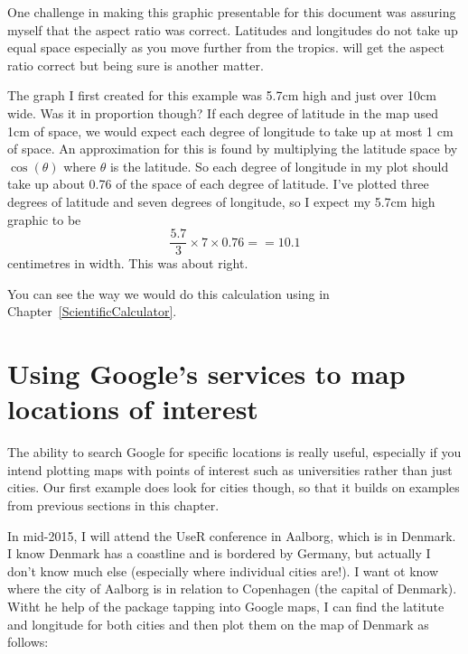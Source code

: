 One challenge in making this graphic presentable for this document  
was assuring myself that the aspect ratio was correct. Latitudes and longitudes do not take up equal space especially as you move further from the tropics. \R{} will get the aspect ratio correct but being sure is another matter.  
 
The graph I first created for this example was 5.7cm high and just over 10cm wide. Was it in proportion though? If each degree of latitude in the map used 1cm of space, we would expect each degree of longitude to take up at most 1 cm of space. An approximation for this is found by multiplying the latitude space by $\cos(\theta)$ where $\theta$ is the latitude. So each degree of longitude in my plot should take up about 0.76 of the space of each degree of latitude. I've plotted three degrees of latitude and seven degrees of longitude, so I expect my 5.7cm high graphic to be  
$$ \frac{5.7}{3} \times 7 \times 0.76 == 10.1 $$ 
centimetres in width. This was about right.  
 
You can see the way we would do this calculation using \R{} in Chapter~\ref{ScientificCalculator}. 
 
 
\section{Using Google's services to map locations of interest} 
 
The ability to search Google for specific locations is really useful, especially if you intend plotting maps with points of interest such as universities rather than just cities. Our first example does look for cities though, so that it builds on examples from previous sections in this chapter. 
 
In mid-2015, I will attend the UseR conference in Aalborg, which is in Denmark. I know Denmark has a coastline and is bordered by Germany, but actually I don't know much else (especially where individual cities are!). I want ot know where the city of Aalborg is in relation to Copenhagen (the capital of Denmark). Witht he help of the  package tapping into Google maps, I can find the latitute and longitude for both cities and then plot them on the map of Denmark as follows: 


